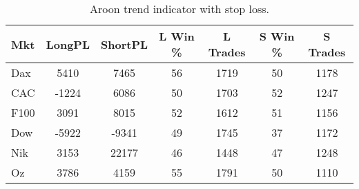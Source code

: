 \begin{table}[ht]
\centering
\caption[Aroon trend indicator with Stop Loss]{Aroon trend indicator with stop loss.} 
\label{tab:aroon_results_sloss}
\begin{tabular}{lcccccc}
  \toprule Mkt & LongPL & ShortPL & L Win \% & L Trades & S Win \% & S Trades \\ 
  \midrule Dax & 5410 & 7465 & 56 & 1719 & 50 & 1178 \\ 
  CAC & -1224 & 6086 & 50 & 1703 & 52 & 1247 \\ 
  F100 & 3091 & 8015 & 52 & 1612 & 51 & 1156 \\ 
  Dow & -5922 & -9341 & 49 & 1745 & 37 & 1172 \\ 
  Nik & 3153 & 22177 & 46 & 1448 & 47 & 1248 \\ 
  Oz & 3786 & 4159 & 55 & 1791 & 50 & 1110 \\ 
   \bottomrule \end{tabular}
\end{table}
